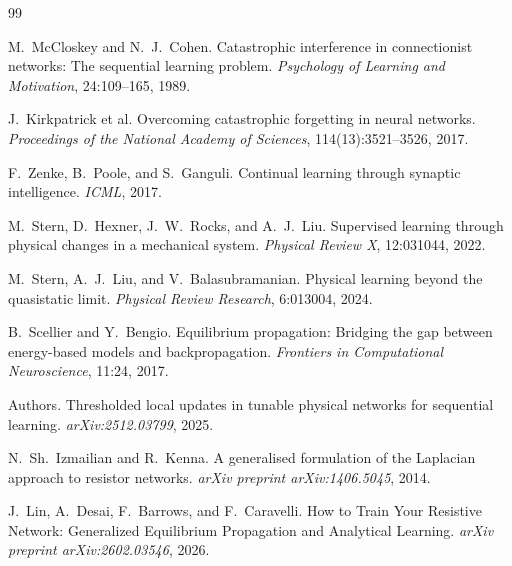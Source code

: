 \begin{thebibliography}{99}

M.\ McCloskey and N.\ J.\ Cohen.
\newblock Catastrophic interference in connectionist networks: The sequential
learning problem.
\newblock \emph{Psychology of Learning and Motivation}, 24:109--165, 1989.

J.\ Kirkpatrick et al.
\newblock Overcoming catastrophic forgetting in neural networks.
\newblock \emph{Proceedings of the National Academy of Sciences},
114(13):3521--3526, 2017.

F.\ Zenke, B.\ Poole, and S.\ Ganguli.
\newblock Continual learning through synaptic intelligence.
\newblock \emph{ICML}, 2017.

M.\ Stern, D.\ Hexner, J.\ W.\ Rocks, and A.\ J.\ Liu.
\newblock Supervised learning through physical changes in a mechanical system.
\newblock \emph{Physical Review X}, 12:031044, 2022.

M.\ Stern, A.\ J.\ Liu, and V.\ Balasubramanian.
\newblock Physical learning beyond the quasistatic limit.
\newblock \emph{Physical Review Research}, 6:013004, 2024.

B.\ Scellier and Y.\ Bengio.
\newblock Equilibrium propagation: Bridging the gap between energy-based
models and backpropagation.
\newblock \emph{Frontiers in Computational Neuroscience}, 11:24, 2017.

Authors.
\newblock Thresholded local updates in tunable physical networks for
sequential learning.
\newblock \emph{arXiv:2512.03799}, 2025.

N.\ Sh.\ Izmailian and R.\ Kenna.
\newblock A generalised formulation of the Laplacian approach to resistor
networks.
\newblock \emph{arXiv preprint arXiv:1406.5045}, 2014.

J.\ Lin, A.\ Desai, F.\ Barrows, and F.\ Caravelli.
\newblock How to Train Your Resistive Network: Generalized Equilibrium
Propagation and Analytical Learning.
\newblock \emph{arXiv preprint arXiv:2602.03546}, 2026.

\end{thebibliography}
